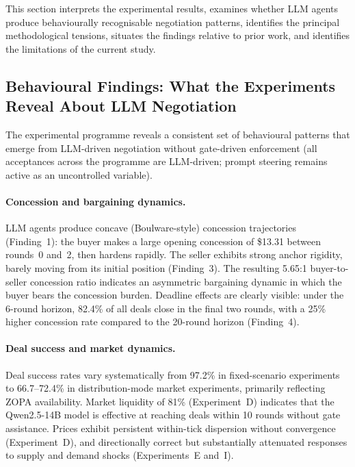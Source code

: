 
\label{sec:discussion}

This section interprets the experimental results, examines whether LLM agents produce behaviourally recognisable negotiation patterns, identifies the principal methodological tensions, situates the findings relative to prior work, and identifies the limitations of the current study.

\subsection{Behavioural Findings: What the Experiments Reveal About LLM Negotiation}
\label{sec:disc-positive}

The experimental programme reveals a consistent set of behavioural patterns that emerge from LLM-driven negotiation without gate-driven enforcement (all acceptances across the programme are LLM-driven; prompt steering remains active as an uncontrolled variable).

\paragraph{Concession and bargaining dynamics.}
LLM agents produce concave (Boulware-style) concession trajectories (Finding~1): the buyer makes a large opening concession of \$13.31 between rounds~0 and~2, then hardens rapidly.  The seller exhibits strong anchor rigidity, barely moving from its initial position (Finding~3).  The resulting 5.65:1 buyer-to-seller concession ratio indicates an asymmetric bargaining dynamic in which the buyer bears the concession burden.  Deadline effects are clearly visible: under the 6-round horizon, 82.4\% of all deals close in the final two rounds, with a 25\% higher concession rate compared to the 20-round horizon (Finding~4).

\paragraph{Deal success and market dynamics.}
Deal success rates vary systematically from 97.2\% in fixed-scenario experiments to 66.7--72.4\% in distribution-mode market experiments, primarily reflecting ZOPA availability.  Market liquidity of 81\% (Experiment~D) indicates that the Qwen2.5-14B model is effective at reaching deals within 10 rounds without gate assistance.  Prices exhibit persistent within-tick dispersion without convergence (Experiment~D), and directionally correct but substantially attenuated responses to supply and demand shocks (Experiments~E and~I).

